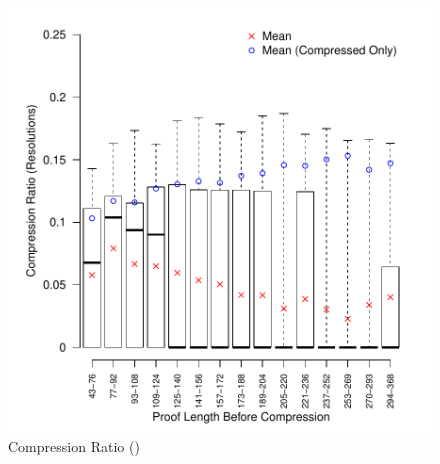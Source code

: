 {\begin{figure}[bt]
\centering
  \includegraphics[scale=0.5]{images/final-random-forpi-compress_ratio_res_vs_proof_res_length.pdf}
  
    \caption{Compression Ratio (\FORPI)}
    \label{fig:forpimean}
    \end{figure}

\begin{figure}[p]
    

\end{figure}}

